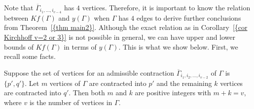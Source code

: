 \documentclass[12pt]{amsart}
\theoremstyle{example}
\theoremstyle{definition}
\theoremstyle{notation}
\begin{document}
Note that ${{\overline{\Gamma}}}_{i_1,\dots, i_{v-4}}$ has $4$ vertices. Therefore,  it is important to know the relation between $Kf({\Gamma})$ and $y({\Gamma})$ when ${\Gamma}$ has $4$ edges to derive further conclusions from {Theorem~\ref{{thm main2}}}. Although the exact relation as in {Corollary~\ref{{cor Kirchhoff v=2 or 3}}} is not possible in general, we can have upper and lower bounds of $Kf({\Gamma})$ in terms of $y({\Gamma})$. This is what we show below.
First, we recall some facts.

Suppose the set of vertices for an admissible contraction ${{\overline{\Gamma}}}_{i_1,i_2, \dots, i_{v-2}}$ of ${\Gamma}$ is $\{p', q'\}$.
Let $m$ vertices of ${\Gamma}$ are contracted into $p'$ and the remaining $k$ vertices are contracted into $q'$. Then both $m$ and $k$
are positive integers with $m+k=v$, where $v$ is the number of vertices in ${\Gamma}$.
\end{document}
